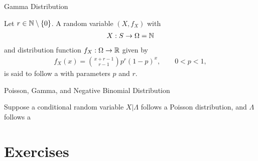 \begin{frame}{Gamma Distribution}

\justifying
{} Let $r\in \mathbb{N}\setminus \{0\}$. A random variable $(X, f_X)$ with
\begin{align*}
X: S \rightarrow \Omega = \mathbb{N}
\end{align*}
and distribution function $f_X: \Omega\rightarrow \mathbb{R}$ given by
\begin{align*}
f_X(x) = \binom{x+r-1}{r-1} p^r(1-p)^{x}, \qquad 0 < p < 1,
\end{align*}
is said to follow a  with parameters $p$ and $r$.

\end{frame}

\begin{frame}{Poisson, Gamma, and Negative Binomial Distribution}

\justifying
Suppose a conditional random variable $X|\Lambda$ follows a Poisson distribution, and $\Lambda$ follows a 

\end{frame}


\section{Exercises}


